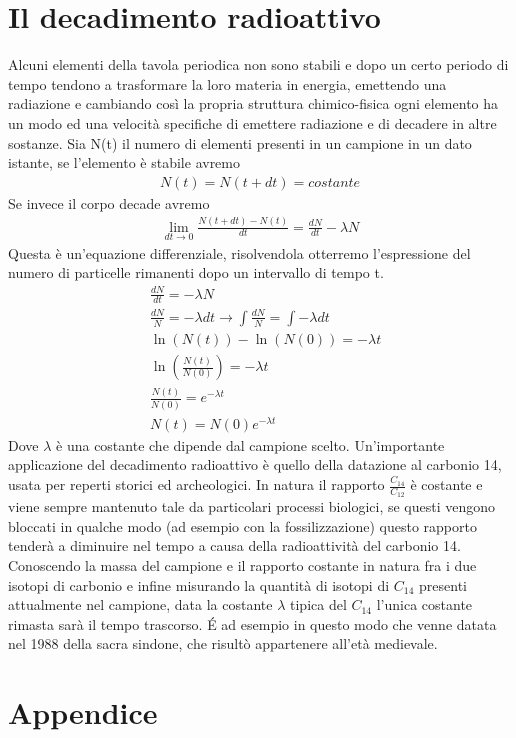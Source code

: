 \documentclass[10pt,a4paper]{article}
\begin{document}
\section{Il decadimento radioattivo}
Alcuni elementi della tavola periodica non sono stabili e dopo un certo periodo di tempo tendono a trasformare la loro materia in energia, emettendo una radiazione e cambiando così la propria struttura chimico-fisica ogni elemento ha un modo ed una velocità specifiche di emettere radiazione e di decadere in altre sostanze. Sia N(t) il numero di elementi presenti in un campione in un dato istante, se l'elemento è stabile avremo
\begin{align*}
	N(t) =  N(t+dt) = costante
\end{align*} 
Se invece il corpo decade avremo
\begin{align*}
	\lim_{dt \to 0}\frac{N(t+dt)-N(t)}{dt} =\frac{dN}{dt} -\lambda N
\end{align*}
Questa è un'equazione differenziale, risolvendola otterremo l'espressione del numero di particelle rimanenti dopo un intervallo di tempo t.
\begin{align*}
&\frac{dN}{dt} = -\lambda N\\
&\frac{dN}{N} = -\lambda dt \rightarrow \int \frac{dN}{N} = \int -\lambda dt\\
&\ln(N(t))-\ln(N(0))=-\lambda t\\
&\ln(\frac{N(t)}{N(0)})=-\lambda t\\
&\frac{N(t)}{N(0)} = e^{-\lambda t}\\
&N(t)=N(0)e^{-\lambda t}
\end{align*}
Dove $\lambda$ è una costante che dipende dal campione scelto. Un'importante applicazione del decadimento radioattivo è quello della datazione al carbonio 14, usata per reperti storici ed archeologici. In natura il rapporto $\frac{C_14}{C_12}$ è costante e viene sempre mantenuto tale da particolari processi biologici, se questi vengono bloccati in qualche modo (ad esempio con la fossilizzazione) questo rapporto tenderà a diminuire nel tempo a causa della radioattività del carbonio 14. Conoscendo la massa del campione e il rapporto costante in natura fra i due isotopi di carbonio e infine misurando la quantità di isotopi di $C_14$ presenti attualmente nel campione, data la costante $\lambda$ tipica del $C_14$ l'unica costante rimasta sarà il tempo trascorso. \'{E} ad esempio in questo modo che venne datata nel 1988 della sacra sindone, che risultò appartenere all'età medievale. 
\newpage
\section{Appendice}
\end{document}
